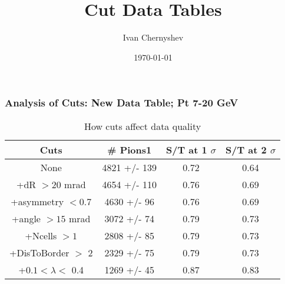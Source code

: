 \documentclass{beamer}
\title{Cut Data Tables}
\author{Ivan Chernyshev}
\date{\today}
\begin{document}

\frame
{
\frametitle{Analysis of Cuts: New Data Table;  Pt 7-20 GeV}
\begin{table}
\caption{How cuts affect data quality}
\centering
\begin{tabular}{c c c c}
\hline\hline
Cuts & \# Pions1 & S/T at 1 $\sigma$ &  S/T at 2 $\sigma$ \\ [0.5ex] %
\hline
None & 4821 +/- 139 & 0.72 & 0.64 \\
+dR $> 20$ mrad & 4654 +/- 110 & 0.76 & 0.69 \\
+asymmetry $< 0.7$ & 4630 +/- 96 & 0.76 & 0.69 \\
+angle $> 15$ mrad & 3072 +/- 74 & 0.79 & 0.73 \\
+Ncells $> 1$& 2808 +/- 85 & 0.79 & 0.73\\
+DisToBorder $>$ 2 & 2329 +/- 75 & 0.79 & 0.73 \\
+$0.1 < \lambda <$ 0.4 & 1269 +/- 45 & 0.87 & 0.83 \\ [1ex]
\hline
\end{tabular}
\label{table:nonlin}
\end{table}
}
\end{document}
